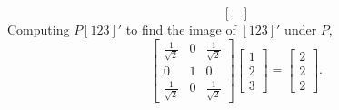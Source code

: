 \documentclass[12pt]{article}
\makeatletter
\theoremstyle{homework}
\newenvironment{exercise}[1]
{\def\@currentlabel{#1}\exercisecore}
{\endexercisecore}
\makeatother
\begin{document}
\begin{exercise}{6.4}
\begin{enumerate}
\begin{equation*}
\begin{bmatrix}
        \end{bmatrix}
    \end{equation*} 
    Computing $P[1 2 3]'$ to find the image of $[1 2 3]'$ under $P$, 
    \begin{equation*}
      \begin{bmatrix}
        \frac{1}{\sqrt{2}} & 0 & \frac{1}{\sqrt{2}}\\
        0 & 1 & 0\\
        \frac{1}{\sqrt{2}} & 0& \frac{1}{\sqrt{2}}
      \end{bmatrix}
      \begin{bmatrix}
        1\\
        2\\
        3
      \end{bmatrix} = 
      \begin{bmatrix}
        2\\
        2\\
        2
      \end{bmatrix}.
    \end{equation*}
    \vspace{.15in}



\end{enumerate}
\end{exercise}
\end{document}
